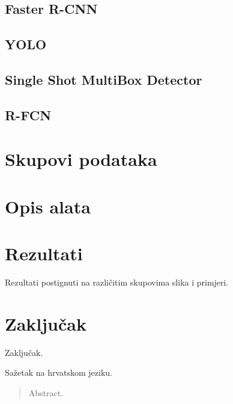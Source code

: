 \documentclass[times, utf8, diplomski]{fer}
\begin{document}
\section{Faster R-CNN}


\section{YOLO}


\section{Single Shot MultiBox Detector}


\section{R-FCN}


\chapter{Skupovi podataka}


\chapter{Opis alata}


\chapter{Rezultati}
Rezultati postignuti na različitim skupovima slika i primjeri.



\chapter{Zaključak}
Zaključak.





\begin{sazetak}
Sažetak na hrvatskom jeziku.

\end{sazetak}

\begin{abstract}
Abstract.

\end{abstract}
\end{document}
